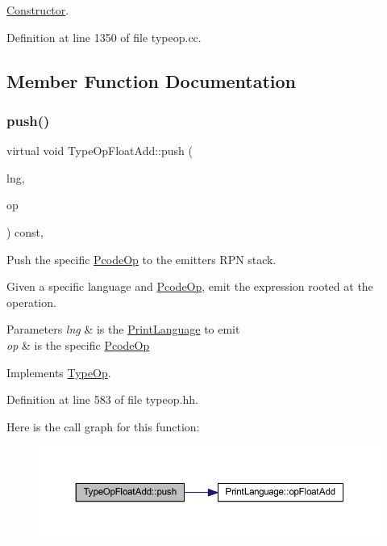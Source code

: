 \mbox{\hyperlink{class_constructor}{Constructor}}. 



Definition at line 1350 of file typeop.\+cc.



\subsection{Member Function Documentation}
\mbox{\label{class_type_op_float_add_a334917eafcc256e77a3ebd65875aa548}} 
\subsubsection{\texorpdfstring{push()}{push()}}
{\footnotesize\ttfamily virtual void Type\+Op\+Float\+Add\+::push (\begin{DoxyParamCaption}\item[{\mbox{\hyperlink{class_print_language}{Print\+Language}} $\ast$}]{lng,  }\item[{const \mbox{\hyperlink{class_pcode_op}{Pcode\+Op}} $\ast$}]{op }\end{DoxyParamCaption}) const\hspace{0.3cm}{\ttfamily [inline]}, {\ttfamily [virtual]}}



Push the specific \mbox{\hyperlink{class_pcode_op}{Pcode\+Op}} to the emitter\textquotesingle{}s R\+PN stack. 

Given a specific language and \mbox{\hyperlink{class_pcode_op}{Pcode\+Op}}, emit the expression rooted at the operation. 
\begin{DoxyParams}{Parameters}
{\em lng} & is the \mbox{\hyperlink{class_print_language}{Print\+Language}} to emit \\
\hline
{\em op} & is the specific \mbox{\hyperlink{class_pcode_op}{Pcode\+Op}} \\
\hline
\end{DoxyParams}


Implements \mbox{\hyperlink{class_type_op_ac9c9544203ed74dabe6ac662b653b2af}{Type\+Op}}.



Definition at line 583 of file typeop.\+hh.

Here is the call graph for this function\+:
\nopagebreak
\begin{figure}[H]
\begin{center}
\leavevmode
\includegraphics[width=350pt]{class_type_op_float_add_a334917eafcc256e77a3ebd65875aa548_cgraph}
\end{center}
\end{figure}


